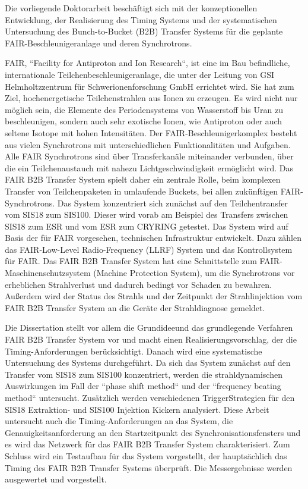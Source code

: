 Die vorliegende Doktorarbeit besch\"aftigt sich mit der konzeptionellen Entwicklung, der Realisierung des Timing Systems und der systematischen Untersuchung des Bunch-to-Bucket (B2B) Transfer Systems f\"ur die geplante FAIR-Beschleunigeranlage und deren Synchrotrons.

FAIR, ``Facility for Antiproton and Ion Research``, ist eine im Bau befindliche, internationale Teilchenbeschleunigeranlage, die unter der Leitung von GSI Helmholtzzentrum f\"ur Schwerionenforschung GmbH errichtet wird. Sie hat zum Ziel, hochenergetische Teilchenstrahlen aus Ionen zu erzeugen. Es wird nicht nur möglich sein, die Elemente des Periodensystems von Wasserstoff bis Uran zu beschleunigen, sondern auch sehr exotische Ionen, wie Antiproton oder auch seltene Isotope mit hohen Intensit\"aten. Der FAIR-Beschleunigerkomplex besteht aus vielen Synchrotrons mit unterschiedlichen Funktionalit\"aten und Aufgaben. Alle FAIR Synchrotrons
sind \"uber Transferkan\"ale miteinander verbunden, \"uber die ein Teilchenaustauch mit nahezu Lichtgeschwindigkeit erm\"oglicht wird. Das FAIR B2B Transfer System spielt daher ein zentrale Rolle, beim komplexen Transfer von Teilchenpaketen in umlaufende Buckets, bei allen zuk\"unftigen FAIR-Synchrotrons. Das System konzentriert sich zun\"achst auf den Teilchentransfer vom SIS18 zum SIS100. Dieser wird vorab am Beispiel des Transfers zwischen SIS18 zum ESR und vom ESR zum CRYRING getestet. Das System wird auf Basis der f\"ur FAIR
vorgesehen, technischen Infrastruktur entwickelt. Dazu z\"ahlen das FAIR-Low-Level Radio-Frequency (LLRF) System und das Kontrollsystem f\"ur FAIR. Das FAIR B2B Transfer System hat eine Schnittstelle zum FAIR-Maschinenschutzsystem (Machine Protection System), um die Synchrotrons vor erheblichen Strahlverlust und dadurch bedingt vor Schaden zu bewahren. Au\ss erdem wird der Status des Strahls und der Zeitpunkt der Strahlinjektion vom FAIR B2B Transfer System an die Ger\"ate der Strahldiagnose gemeldet.

Die Dissertation stellt vor allem die Grundideeund das grundlegende Verfahren FAIR B2B Transfer System vor und macht einen Realisierungsvorschlag, der die Timing-Anforderungen berücksichtigt. Danach wird eine systematische Untersuchung des Systems durchgeführt. Da sich das System zun\"achst auf den Transfer vom SIS18 zum SIS100 konzentriert, werden die strahldynamischen Auswirkungen im Fall der ``phase shift method`` und der ``frequency beating method`` untersucht. Zus\"atzlich werden verschiedenen TriggerStrategien f\"ur den SIS18 Extraktion- und SIS100 Injektion Kickern analysiert. Diese Arbeit untersucht auch die Timing-Anforderungen an das System, die Genauigkeitsanforderung an den Startzeitpunkt des Synchronisationsfensters und es wird das Netzwerk für das FAIR B2B Transfer System charakterisiert. Zum Schluss wird ein Testaufbau f\"ur das System vorgestellt, der haupts\"achlich das Timing des FAIR B2B Transfer Systems \"uberpr\"uft. Die Messergebnisse werden ausgewertet und vorgestellt.

